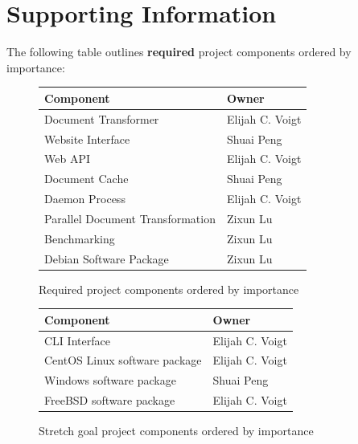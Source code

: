 \section{Supporting Information}


The following table outlines \textbf{required} project components ordered by importance:

\begin{figure}
\begin{center}
    \begin{tabular}{ | l | l | }
    \hline
      Component & Owner \\ \hline
      Document Transformer & Elijah C. Voigt \\ \hline
      Website Interface & Shuai Peng \\ \hline
      Web API & Elijah C. Voigt \\ \hline
      Document Cache & Shuai Peng \\ \hline
      Daemon Process & Elijah C. Voigt \\ \hline
      Parallel Document Transformation & Zixun Lu \\ \hline
      Benchmarking & Zixun Lu \\ \hline
      Debian Software Package & Zixun Lu \\ \hline
    \end{tabular}
\end{center}
\caption{Required project components ordered by importance}
\end{figure}

\begin{figure}
\begin{center}
    \begin{tabular}{ | l | l | }
    \hline
      Component & Owner \\ \hline
      CLI Interface & Elijah C. Voigt \\ \hline
      CentOS Linux software package & Elijah C. Voigt \\ \hline
      Windows software package & Shuai Peng \\ \hline
      FreeBSD software package & Elijah C. Voigt  \\ \hline
    \end{tabular}
\end{center}
\caption{Stretch goal project components ordered by importance}
\end{figure}


